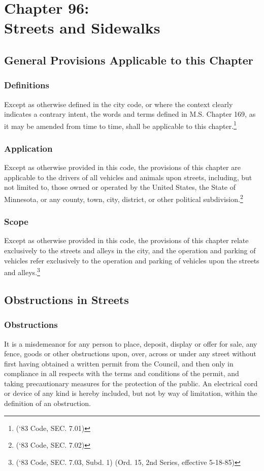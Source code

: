 \chapter*{Chapter 96: \\
	Streets and Sidewalks}
    \vfill
    \minitoc
    \pagebreak

\section{General Provisions Applicable to this Chapter}
\subsection{Definitions}
Except as otherwise defined in the city code, or where the context clearly indicates a contrary intent, the words and terms defined in M.S. Chapter 169, as it may be amended from time to time, shall be applicable to this chapter.\footnote{(‘83 Code, SEC. 7.01)}
\subsection{Application}
Except as otherwise provided in this code, the provisions of this chapter are applicable to the drivers of all vehicles and animals upon streets, including, but not limited to, those owned or operated by the United States, the State of Minnesota, or any county, town, city, district, or other political subdivision.\footnote{(‘83 Code, SEC. 7.02)}
\subsection{Scope}
Except as otherwise provided in this code, the provisions of this chapter relate exclusively to the streets and alleys in the city, and the operation and parking of vehicles refer exclusively to the operation and parking of vehicles upon the streets and alleys.\footnote{(‘83 Code, SEC. 7.03, Subd. 1)  (Ord. 15, 2nd Series, effective 5-18-85)}

\section{Obstructions in Streets}
\subsection{Obstructions}
It is a misdemeanor for any person to place, deposit, display or offer for sale, any fence, goods or other obstructions upon, over, across or under any street without first having obtained a written permit from the Council, and then only in compliance in all respects with the terms and conditions of the permit, and taking precautionary measures for the protection of the public.  An electrical cord or device of any kind is hereby included, but not by way of limitation, within the definition of an obstruction.
